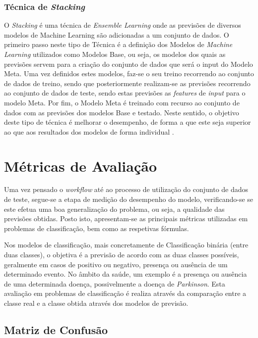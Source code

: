 \documentclass[12pt,a4paper,twoside]{report}
\begin{document}
{\subsubsection{Técnica de \textit{Stacking}}

O \textit{Stacking}  é uma técnica de \textit{Ensemble Learning} onde as previsões de diversos modelos de Machine Learning são adicionadas a um conjunto de dados. O primeiro passo neste tipo de Técnica é a definição dos Modelos de \textit{Machine Learning} utilizados como Modelos Base, ou seja, os  modelos dos quais as previsões servem para a criação do conjunto de dados que será o input do Modelo Meta. Uma vez definidos estes modelos, faz-se o seu treino recorrendo ao conjunto de dados de treino, sendo que posteriormente realizam-se as previsões recorrendo ao conjunto de dados de teste, sendo estas previsões as \textit{features} de \textit{input} para o modelo Meta. Por fim, o Modelo Meta é treinado com recurso ao conjunto de dados com as previsões dos modelos Base e testado. Neste sentido, o objetivo deste tipo de técnica é melhorar o desempenho, de forma a que este seja superior ao que aos resultados dos modelos de forma individual \cite{thanoun}.


\section{Métricas de Avaliação}

Uma vez pensado o \textit{workflow} até ao processo de utilização do conjunto de dados de teste, segue-se a etapa de medição do desempenho do modelo, verificando-se se este efetua uma boa generalização do problema, ou seja, a qualidade das previsões obtidas. Posto isto, apresentam-se as principais métricas utilizadas em problemas de classificação, bem como as respetivas fórmulas.

Nos modelos de classificação, mais concretamente de Classificação binária (entre duas classes), o objetiva é a previsão de acordo com as duas classes possíveis, geralmente em casos de positivo ou negativo, presença ou ausência de um determinado evento. No âmbito da saúde, um exemplo é a presença ou ausência de uma determinada doença, possivelmente a doença de \textit{Parkinson}. Esta avaliação em problemas de classificação é realiza através da comparação entre a classe real e a classe obtida através dos modelos de previsão.

\subsection{Matriz de Confusão}

}
\end{document}
